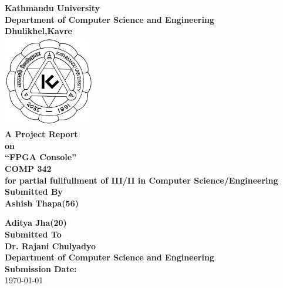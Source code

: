 \documentclass[a4paper,12pt]{article}
\begin{document}
\setcounter{secnumdepth}{4} %
\setcounter{tocdepth}{4} %

\begin{center}
    \textbf{\Large Kathmandu University} \\[0.3cm]
    \textbf{\large Department of Computer Science and Engineering} \\[0.3cm]
    \textbf{\Large Dhulikhel,Kavre} \\[0.8cm]

    \includegraphics[width=0.3\textwidth]{images/ku.jpg} \\[0.6cm]


    \textbf{\large A Project Report} \\[0.3cm]
    \textbf{\large on} \\[0.6cm]
    { \huge \bfseries “FPGA Console”} \\[0.3cm]

    { \large \bfseries COMP 342} \\[0.3cm]

    { \normalsize \bfseries for  partial fullfullment of III/II in Computer Science/Engineering} \\[0.6cm]

    \textbf{\large Submitted By} \\[0.2cm]

    \textbf{\large Ashish Thapa(56)}

    \textbf{\large Aditya Jha(20)} \\[1.2cm]

    \textbf{\large Submitted To} \\[0.2cm]
    \textbf{\large Dr. Rajani Chulyadyo} \\[0.2cm]
    \textbf{\large Department of Computer Science and Engineering} \\[1.5cm]


    \textbf{\large Submission Date:} \\[0.3cm]
    \today
\end{center}
\end{document}
